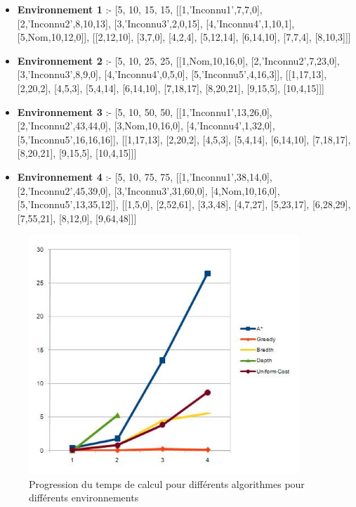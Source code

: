 \documentclass[12pt,english,frenchb,letterpaper]{article}
\begin{document}
\begin{itemize}
\item 
\textbf{Environnement 1} :- 
[5, 10, 15, 15, [[1,'Inconnu1',7,7,0], [2,'Inconnu2',8,10,13], [3,'Inconnu3',2,0,15], [4,'Inconnu4',1,10,1], [5,Nom,10,12,0]], [[2,12,10], [3,7,0], [4,2,4], [5,12,14], [6,14,10], [7,7,4], [8,10,3]]]
\item 
\textbf{Environnement 2} :- 
[5, 10, 25, 25, [[1,Nom,10,16,0], [2,'Inconnu2',7,23,0], [3,'Inconnu3',8,9,0], [4,'Inconnu4',0,5,0], [5,'Inconnu5',4,16,3]], [[1,17,13], [2,20,2], [4,5,3], [5,4,14], [6,14,10], [7,18,17], [8,20,21], [9,15,5], [10,4,15]]]
\item 
\textbf{Environnement 3} :- 
[5, 10, 50, 50, [[1,'Inconnu1',13,26,0], [2,'Inconnu2',43,44,0], [3,Nom,10,16,0], [4,'Inconnu4',1,32,0], [5,'Inconnu5',16,16,16]], [[1,17,13], [2,20,2], [4,5,3], [5,4,14], [6,14,10], [7,18,17], [8,20,21], [9,15,5], [10,4,15]]]
\item 
\textbf{Environnement 4} :- 
[5, 10, 75, 75, [[1,'Inconnu1',38,14,0], [2,'Inconnu2',45,39,0], [3,'Inconnu3',31,60,0], [4,Nom,10,16,0], [5,'Inconnu5',13,35,12]], [[1,5,0], [2,52,61], [3,3,48], [4,7,27], [5,23,17], [6,28,29], [7,55,21], [8,12,0], [9,64,48]]]
\end{itemize}


\begin{figure}[!h] %
\includegraphics[width=4in]{resultats-planif} %
\caption{Progression du temps de calcul pour différents algorithmes pour différents environnements} 
\end{figure}
\end{document}
